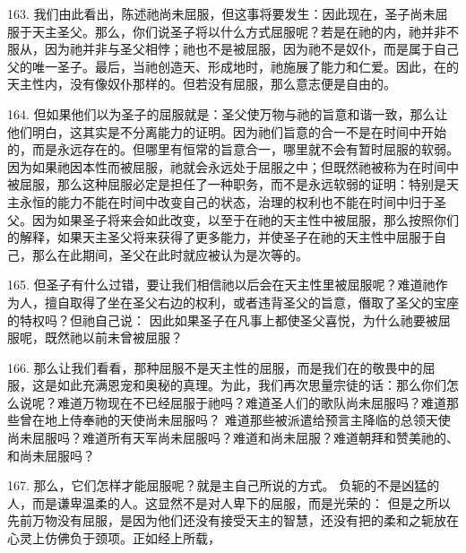 163. 我们由此看出，陈述祂尚未屈服，但这事将要发生：因此现在，圣子尚未屈服于天主圣父。那么，你们说圣子将以什么方式屈服呢？若是在祂的内，祂并非不服从，因为祂并非与圣父相悖；祂也不是被屈服，因为祂不是奴仆，而是属于自己父的唯一圣子。最后，当祂创造天、形成地时，祂施展了能力和仁爱。因此，在的天主性内，没有像奴仆那样的。但若没有屈服，那么意志便是自由的。\par

164. 但如果他们以为圣子的屈服就是：圣父使万物与祂的旨意和谐一致，那么让他们明白，这其实是不分离能力的证明。因为祂们旨意的合一不是在时间中开始的，而是永远存在的。但哪里有恒常的旨意合一，哪里就不会有暂时屈服的软弱。因为如果祂因本性而被屈服，祂就会永远处于屈服之中；但既然祂被称为在时间中被屈服，那么这种屈服必定是担任了一种职务，而不是永远软弱的证明：特别是天主永恒的能力不能在时间中改变自己的状态，治理的权利也不能在时间中归于圣父。因为如果圣子将来会如此改变，以至于在祂的天主性中被屈服，那么按照你们的解释，如果天主圣父将来获得了更多能力，并使圣子在祂的天主性中屈服于自己，那么在此期间，圣父在此时就应被认为是次等的。\par

165. 但圣子有什么过错，要让我们相信祂以后会在天主性里被屈服呢？难道祂作为人，擅自取得了坐在圣父右边的权利，或者违背圣父的旨意，僭取了圣父的宝座的特权吗？但祂自己说： 因此如果圣子在凡事上都使圣父喜悦，为什么祂要被屈服呢，既然祂以前未曾被屈服？\par

166. 那么让我们看看，那种屈服不是天主性的屈服，而是我们在的敬畏中的屈服，这是如此充满恩宠和奥秘的真理。为此，我们再次思量宗徒的话：那么你们怎么说呢？难道万物现在不已经屈服于祂吗？难道圣人们的歌队尚未屈服吗？难道那些曾在地上侍奉祂的天使尚未屈服吗？ 难道那些被派遣给预言主降临的总领天使尚未屈服吗？难道所有天军尚未屈服吗？难道和尚未屈服？难道朝拜和赞美祂的、和尚未屈服吗？\par

167. 那么，它们怎样才能屈服呢？就是主自己所说的方式。 负轭的不是凶猛的人，而是谦卑温柔的人。这显然不是对人卑下的屈服，而是光荣的： 但是之所以先前万物没有屈服，是因为他们还没有接受天主的智慧，还没有把的柔和之轭放在心灵上仿佛负于颈项。正如经上所载，\par

